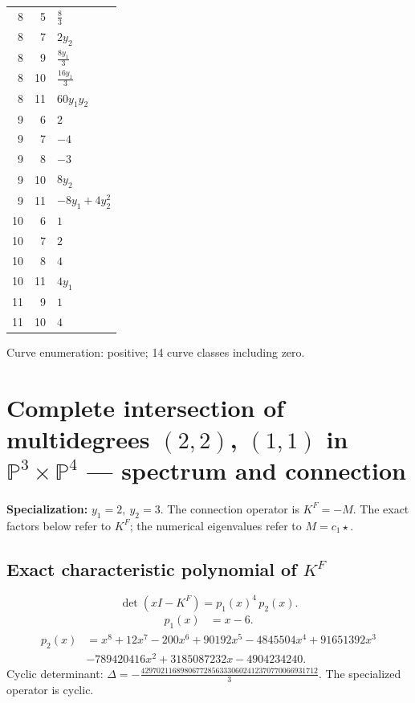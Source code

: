 \documentclass[10pt,a4paper]{article}
\begin{document}
{\begin{longtable}{rrp{125mm}}
8 & 5 & $\frac{8}{3}$\\
8 & 7 & $2 y_{2}$\\
8 & 9 & $\frac{8 y_{1}}{3}$\\
8 & 10 & $\frac{16 y_{1}}{3}$\\
8 & 11 & $60 y_{1} y_{2}$\\
9 & 6 & $2$\\
9 & 7 & $-4$\\
9 & 8 & $-3$\\
9 & 10 & $8 y_{2}$\\
9 & 11 & $- 8 y_{1} + 4 y_{2}^{2}$\\
10 & 6 & $1$\\
10 & 7 & $2$\\
10 & 8 & $4$\\
10 & 11 & $4 y_{1}$\\
11 & 9 & $1$\\
11 & 10 & $4$\\
\end{longtable}}
Curve enumeration: positive; 14 curve classes including zero.
\clearpage\section*{Complete intersection of multidegrees $(2,2)$, $(1,1)$ in $\mathbb P^{3}\times \mathbb P^{4}$ --- spectrum and connection}
\textbf{Specialization:} $y_1=2,\ y_2=3$. The connection operator is $K^F=-M$. The exact factors below refer to $K^F$; the numerical eigenvalues refer to $M=c_1\star$.
\subsection*{Exact characteristic polynomial of $K^F$}
\[\det(xI-K^F)=p_{1}(x)^{4}\,p_{2}(x).\]
\[\begin{aligned}p_{1}(x)&=x - 6.\end{aligned}\]
\[\begin{aligned}p_{2}(x)&=x^{8} + 12 x^{7} - 200 x^{6} + 90192 x^{5} - 4845504 x^{4} + 91651392 x^{3}\\&- 789420416 x^{2} + 3185087232 x - 4904234240.\end{aligned}\]
Cyclic determinant: $\Delta=- \frac{429702116898067728563330602412370770066931712}{3}$. The specialized operator is cyclic.
\end{document}
